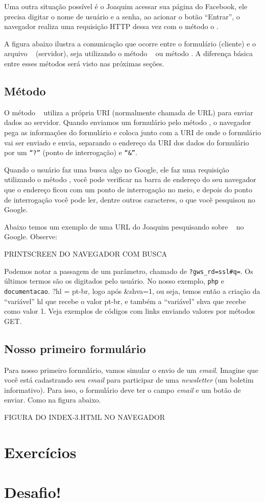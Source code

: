 Uma outra situação possível é o Joaquim acessar sua página do Facebook, ele precisa digitar 
o nome de usuário e a senha, ao acionar o botão “Entrar”, o navegador realiza uma requisição 
HTTP dessa vez com o método o \metodoPOST.

A figura abaixo ilustra a comunicação que ocorre entre o formulário (cliente) e o arquivo 
\php~ (servidor), seja utilizando o método \metodoGET~ ou método \metodoPOST. A diferença básica 
entre esses métodos será visto nas próximas seções. 

\subsection{Método \metodoGET}

O método \metodoGET~ utiliza a própria URI (normalmente chamada de URL) para enviar dados ao 
servidor. Quando enviamos um formulário pelo método \metodoGET, o navegador pega as informações 
do formulário e coloca junto com a URI de onde o formulário vai ser enviado e envia, 
separando o endereço da URI dos dados do formulário por um \texttt{``?''} (ponto de interrogação) 
e \texttt{``\&''}.

Quando o usuário faz uma busca algo no Google, ele faz uma requisição utilizando o método \metodoGET, 
você pode verificar na barra de endereço do seu navegador que o endereço ficou com um ponto de 
interrogação no meio, e depois do ponto de interrogação você pode ler, dentre outros caracteres, 
o que você pesquisou no Google.

Abaixo temos um exemplo de uma URL do Joaquim pesquisando sobre \php~ no Google. Observe:

PRINTSCREEN DO NAVEGADOR COM BUSCA

Podemos notar a passagem de um parâmetro, chamado de \texttt{?gws_rd=ssl#q=}. Os últimos termos
são os digitados pelo usuário. No nosso exemplo, \texttt{php} e \texttt{documentacao}.
?hl = pt-br, logo após &shva=1, ou seja, temos então a criação da “variável” hl que recebe o valor pt-br, e também a “variável” shva que recebe como valor 1. Veja exemplos de códigos com links enviando valores por métodos GET.


\subsection{Nosso primeiro formulário}
\label{nosso-primeiro-formulario}

Para nosso primeiro formulário, vamos simular o envio de um \textit{email}. Imagine que você
está cadastrando seu \textit{email} para participar de uma \textit{newsletter} (um boletim informativo).
Para isso, o formulário deve ter o campo \textit{email} e um botão de enviar. Como na figura abaixo.

FIGURA DO INDEX-3.HTML NO NAVEGADOR




\section{Exercícios}
\label{cap7-exercicios}

\section{Desafio!}
\label{cap7-desafio}
